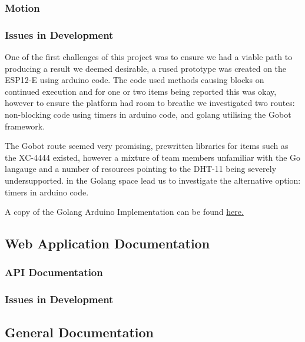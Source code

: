 \documentclass[a4paper,12pt,headings=normal]{article}
\newcounter{num}
\begin{document}
            \subsubsection{Motion}
            \subsubsection{Issues in Development}
                One of the first challenges of this project was to ensure we had a viable
                path to producing a result we deemed desirable, a rused prototype was created
                on the ESP12-E using arduino code.
                The code used methods causing blocks on continued execution and for one or 
                two items being reported this was okay, however to ensure the platform had
                room to breathe we investigated two routes: non-blocking code using timers 
                in arduino code, and golang utilising the Gobot framework\cite{GoBot}.

                \medskip

                The Gobot route seemed very promising, prewritten libraries for items 
                such as the XC-4444\cite{XC-4444} existed, however a mixture of team members 
                unfamiliar with the Go langauge\cite{Golang} and a number of resources
                pointing to the DHT-11\cite{DHT11} being severely undersupported\cite{GolangDHT111Issues}.
                in the Golang space lead us to investigate the alternative option: timers 
                in arduino code.

                A copy of the Golang Arduino Implementation can be found \hyperref[sec:GolangESP12EImplementation]{\color{blue}here.}

                \medskip


        \newpage
        \subsection{Web Application Documentation}
            \subsubsection{API Documentation}
            \subsubsection{Issues in Development}

        \newpage
        \subsection{General Documentation}
\end{document}

